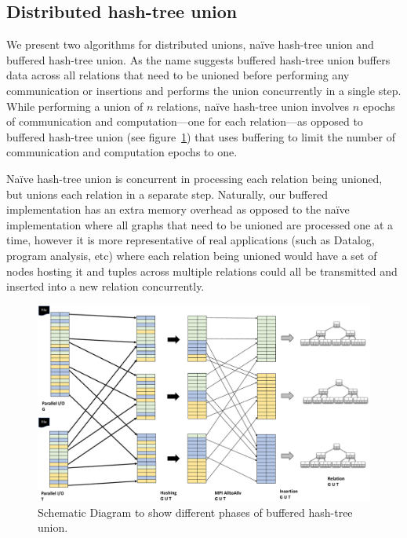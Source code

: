 \subsection{Distributed hash-tree union}


We present two algorithms for distributed unions, na\"ive hash-tree union and buffered hash-tree union. As the name suggests buffered hash-tree union buffers data across all relations that need to be unioned before performing any communication or insertions and performs the union concurrently in a single step. While performing a union of $n$ relations, na\"ive hash-tree union involves $n$ epochs of communication and computation---one for each relation---as opposed to buffered hash-tree union (see figure~\ref{fig:union_2}) that uses buffering to limit the number of communication and computation epochs to one.

Na\"ive hash-tree union is concurrent in processing each relation being unioned, but unions each relation in a separate step. Naturally, our buffered implementation has an extra memory overhead as opposed to the na\"ive implementation where all graphs that need to be unioned are processed one at a time, however it is more representative of real applications (such as Datalog, program analysis, etc) where each relation being unioned would have a set of nodes hosting it and tuples across multiple relations could all be transmitted and inserted into a new relation concurrently.

\begin{figure}[h]
	\includegraphics[width=\columnwidth]{results/union_2.pdf}
	\caption{Schematic Diagram to show different phases of buffered hash-tree union.}
	\label{fig:union_2}
\end{figure}

